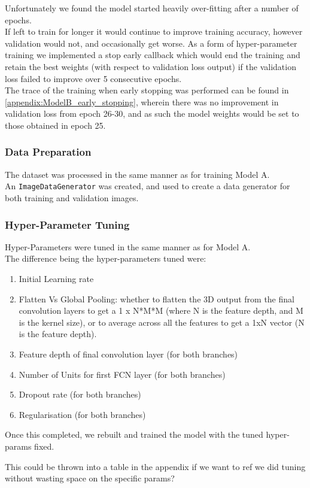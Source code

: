 Unfortunately we found the model started heavily over-fitting after a number of epochs.\\
If left to train for longer it would continue to improve training accuracy, however validation would not, and occasionally get worse.
As a form of hyper-parameter training we implemented a stop early callback which would end the training and retain the best weights (with respect to validation loss output) if the validation loss failed to improve over 5 consecutive epochs.\\
The trace of the training when early stopping was performed can be found in \autoref{appendix:ModelB_early_stopping}, wherein there was no improvement in validation loss from epoch 26-30, and as such the model weights would be set to those obtained in epoch 25.

\subsubsection{Data Preparation}
The dataset was processed in the same manner as for training Model A.\\
An \verb|ImageDataGenerator| was created, and used to create a data generator for both training and validation images.

\begin{optional}
    \subsubsection{Hyper-Parameter Tuning}
    Hyper-Parameters were tuned in the same manner as for Model A.\\
    The difference being the hyper-parameters tuned were:
    \begin{enumerate}
        \item Initial Learning rate
        \item Flatten Vs Global Pooling: whether to flatten the 3D output from the final convolution layers to get a 1 x N*M*M (where N is the feature depth, and M is the kernel size), or to average across all the features to get a 1xN vector (N is the feature depth).
        \item Feature depth of final convolution layer (for both branches)
        \item Number of Units for first FCN layer (for both branches)
        \item Dropout rate (for both branches)
        \item Regularisation (for both branches)
    \end{enumerate}
    Once this completed, we rebuilt and trained the model with the tuned hyper-params fixed.\\
    \begin{notes}
        This could be thrown into a table in the appendix if we want to ref we did tuning without wasting space on the specific params?
    \end{notes}
\end{optional}


